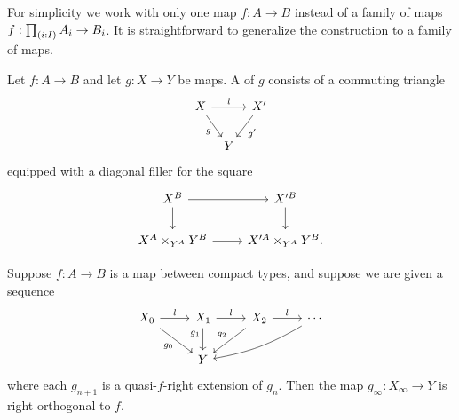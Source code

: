 For simplicity we work with only one map $f:A\to B$ instead of a family of maps $f:\prd{i:I}A_i\to B_i$.
It is straightforward to generalize the construction to a family of maps.

\begin{defn}
Let $f:A\to B$ and let $g:X\to Y$ be maps. A  of $g$ consists of a commuting triangle
\begin{equation*}
\begin{tikzcd}[column sep=tiny]
X \arrow[rr,"l"] \arrow[dr,swap,"g"] & & X' \arrow[dl,"g'"] \\
& Y
\end{tikzcd}
\end{equation*}
equipped with a diagonal filler for the square
\begin{equation*}
\begin{tikzcd}
X^B \arrow[r] \arrow[d] & X'^B \arrow[d] \\
X^A\times_{Y^A}Y^B \arrow[r] & X'^A\times_{Y^A}Y^B.
\end{tikzcd}
\end{equation*}
\end{defn}

\begin{prp}
Suppose $f:A\to B$ is a map between compact types, and suppose we are given a sequence
\begin{equation*}
\begin{tikzcd}
X_0 \arrow[r,"l"] \arrow[dr,swap,"g_0"] & X_1 \arrow[r,"l"] \arrow[d,swap,"g_1" near start] & X_2 \arrow[r,"l"] \arrow[dl,swap,"g_2"] & \cdots \arrow[dll,bend left=10] \\
& Y
\end{tikzcd}
\end{equation*}
where each $g_{n+1}$ is a quasi-$f$-right extension of $g_n$. Then the map $g_\infty:X_\infty\to Y$ is right orthogonal to $f$.
\end{prp}


